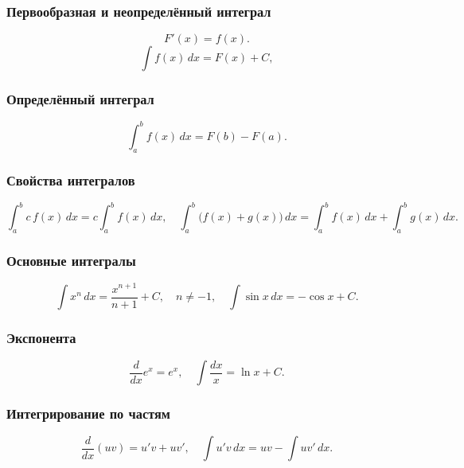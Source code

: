 \documentclass[12pt, a4paper]{article}
\begin{document}
\subsubsection*{Первообразная и неопределённый интеграл}
\[
F'(x)=f(x).
\]
\[
\int f(x)\,dx = F(x) + C,
\]

\subsubsection*{Определённый интеграл}
\[
\int_{a}^{b} f(x)\,dx = F(b) - F(a).
\]

\subsubsection*{Свойства интегралов}
\[
\int_a^b c\,f(x)\,dx = c\int_a^b f(x)\,dx,
\quad
\int_{a}^{b} \bigl(f(x)+g(x)\bigr)\,dx = \int_{a}^{b} f(x)\,dx + \int_{a}^{b} g(x)\,dx.
\]

\subsubsection*{Основные интегралы}
\[
\int x^n\,dx = \frac{x^{n+1}}{n+1} + C,\quad n\neq -1,
\quad
\int \sin x\,dx = -\cos x + C.
\]

\subsubsection*{Экспонента}
\[
\frac{d}{dx}e^x = e^x,
\quad
\int \frac{dx}{x} = \ln x + C.
\]

\subsubsection*{Интегрирование по частям}
\[
\frac{d}{dx}(uv)=u'v+uv',
\quad
\int u'v\,dx = uv - \int uv'\,dx.
\]
\end{document}
